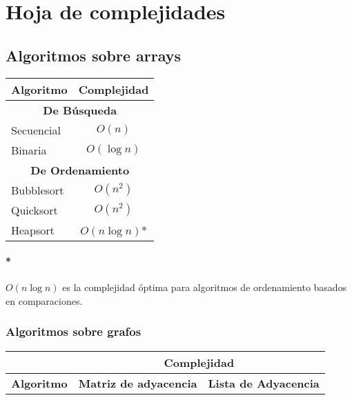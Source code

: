 \appendix
\section{Hoja de complejidades}
\subsection{Algoritmos sobre arrays}
\begin{center}
\begin{tabular}{|l|c|}
	\hline
	\textbf{Algoritmo} & \textbf{Complejidad} \\
	\hline
	\multicolumn{2}{|c|}{\cellcolor{blue!25}\textbf{De Búsqueda}}\\
	\hline
	Secuencial & \(O(n)\) \\
	\hline
	Binaria & \(O(\log{n})\) \\
	\hline
	\multicolumn{2}{|c|}{\cellcolor{blue!25}\textbf{De Ordenamiento}}\\
	\hline
	Bubblesort & \(O(n^2)\) \\
	\hline
	Quicksort & \(O(n^2)\) \\
	\hline
	Heapsort & \(O(n\log{n})\)* \\
	\hline
\end{tabular}
\end{center}

\paragraph{*} \(O(n\log{n})\) es la complejidad óptima para algoritmos de ordenamiento basados en comparaciones. 

\subsubsection{Algoritmos sobre grafos}

\begin{center}
	\begin{tabular}{|l|c|c|}
		\hline
		 & \multicolumn{2}{|c|}{\textbf{Complejidad}} \\
		 \hline
		\textbf{Algoritmo} & \textbf{Matriz de adyacencia} & \textbf{Lista de Adyacencia} \\
		\hline
		
		\hline
	\end{tabular}
\end{center}